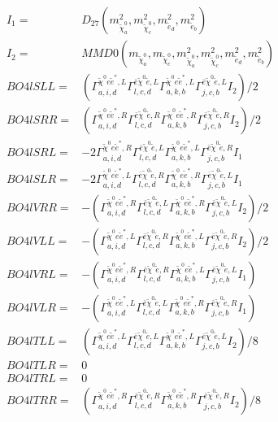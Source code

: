 \documentclass[A4,landscape]{article}
\begin{document}
\begin{align} 
I_1 = & D_{27}(m^2_{\tilde{\chi}^0_{{a}}}, m^2_{\tilde{\chi}^0_{{c}}}, m^2_{\tilde{e}_{{d}}}, m^2_{\tilde{e}_{{b}}}) \\ 
I_2 = & MMD0(m_{\tilde{\chi}^0_{{a}}}, m_{\tilde{\chi}^0_{{c}}}, m^2_{\tilde{\chi}^0_{{a}}}, m^2_{\tilde{\chi}^0_{{c}}}, m^2_{\tilde{e}_{{d}}}, m^2_{\tilde{e}_{{b}}}) \\ 
  BO4lSLL= & ( \Gamma^{\tilde{\chi}^0 e \tilde{e}^*,L}_{a, i, d} \Gamma^{\bar{e}\tilde{\chi}^0 \tilde{e} ,L}_{l, c, d} \Gamma^{\tilde{\chi}^0 e \tilde{e}^*,L}_{a, k, b} \Gamma^{\bar{e}\tilde{\chi}^0 \tilde{e} ,L}_{j, c, b} I_2)/2 \\ 
  BO4lSRR= & ( \Gamma^{\tilde{\chi}^0 e \tilde{e}^*,R}_{a, i, d} \Gamma^{\bar{e}\tilde{\chi}^0 \tilde{e} ,R}_{l, c, d} \Gamma^{\tilde{\chi}^0 e \tilde{e}^*,R}_{a, k, b} \Gamma^{\bar{e}\tilde{\chi}^0 \tilde{e} ,R}_{j, c, b} I_2)/2 \\ 
  BO4lSRL= & -2  \Gamma^{\tilde{\chi}^0 e \tilde{e}^*,R}_{a, i, d} \Gamma^{\bar{e}\tilde{\chi}^0 \tilde{e} ,L}_{l, c, d} \Gamma^{\tilde{\chi}^0 e \tilde{e}^*,L}_{a, k, b} \Gamma^{\bar{e}\tilde{\chi}^0 \tilde{e} ,R}_{j, c, b} I_1 \\ 
  BO4lSLR= & -2  \Gamma^{\tilde{\chi}^0 e \tilde{e}^*,L}_{a, i, d} \Gamma^{\bar{e}\tilde{\chi}^0 \tilde{e} ,R}_{l, c, d} \Gamma^{\tilde{\chi}^0 e \tilde{e}^*,R}_{a, k, b} \Gamma^{\bar{e}\tilde{\chi}^0 \tilde{e} ,L}_{j, c, b} I_1 \\ 
  BO4lVRR= & -( \Gamma^{\tilde{\chi}^0 e \tilde{e}^*,R}_{a, i, d} \Gamma^{\bar{e}\tilde{\chi}^0 \tilde{e} ,L}_{l, c, d} \Gamma^{\tilde{\chi}^0 e \tilde{e}^*,R}_{a, k, b} \Gamma^{\bar{e}\tilde{\chi}^0 \tilde{e} ,L}_{j, c, b} I_2)/2 \\ 
  BO4lVLL= & -( \Gamma^{\tilde{\chi}^0 e \tilde{e}^*,L}_{a, i, d} \Gamma^{\bar{e}\tilde{\chi}^0 \tilde{e} ,R}_{l, c, d} \Gamma^{\tilde{\chi}^0 e \tilde{e}^*,L}_{a, k, b} \Gamma^{\bar{e}\tilde{\chi}^0 \tilde{e} ,R}_{j, c, b} I_2)/2 \\ 
  BO4lVRL= & -( \Gamma^{\tilde{\chi}^0 e \tilde{e}^*,R}_{a, i, d} \Gamma^{\bar{e}\tilde{\chi}^0 \tilde{e} ,R}_{l, c, d} \Gamma^{\tilde{\chi}^0 e \tilde{e}^*,L}_{a, k, b} \Gamma^{\bar{e}\tilde{\chi}^0 \tilde{e} ,L}_{j, c, b} I_1) \\ 
  BO4lVLR= & -( \Gamma^{\tilde{\chi}^0 e \tilde{e}^*,L}_{a, i, d} \Gamma^{\bar{e}\tilde{\chi}^0 \tilde{e} ,L}_{l, c, d} \Gamma^{\tilde{\chi}^0 e \tilde{e}^*,R}_{a, k, b} \Gamma^{\bar{e}\tilde{\chi}^0 \tilde{e} ,R}_{j, c, b} I_1) \\ 
  BO4lTLL= & ( \Gamma^{\tilde{\chi}^0 e \tilde{e}^*,L}_{a, i, d} \Gamma^{\bar{e}\tilde{\chi}^0 \tilde{e} ,L}_{l, c, d} \Gamma^{\tilde{\chi}^0 e \tilde{e}^*,L}_{a, k, b} \Gamma^{\bar{e}\tilde{\chi}^0 \tilde{e} ,L}_{j, c, b} I_2)/8 \\ 
  BO4lTLR= & 0 \\ 
  BO4lTRL= & 0 \\ 
  BO4lTRR= & ( \Gamma^{\tilde{\chi}^0 e \tilde{e}^*,R}_{a, i, d} \Gamma^{\bar{e}\tilde{\chi}^0 \tilde{e} ,R}_{l, c, d} \Gamma^{\tilde{\chi}^0 e \tilde{e}^*,R}_{a, k, b} \Gamma^{\bar{e}\tilde{\chi}^0 \tilde{e} ,R}_{j, c, b} I_2)/8 \\ 
\end{align} 
\end{document}
